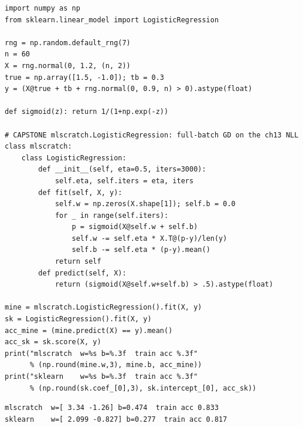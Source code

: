 \begin{lstlisting}[caption={\ttfamily code/ch14\_logistic.py ---
\textbf{capstone}: \texttt{mlscratch.LogisticRegression} trained by GD
on the ch.13 objective, checked against sklearn.}]
import numpy as np
from sklearn.linear_model import LogisticRegression

rng = np.random.default_rng(7)
n = 60
X = rng.normal(0, 1.2, (n, 2))
true = np.array([1.5, -1.0]); tb = 0.3
y = (X@true + tb + rng.normal(0, 0.9, n) > 0).astype(float)

def sigmoid(z): return 1/(1+np.exp(-z))

# CAPSTONE mlscratch.LogisticRegression: full-batch GD on the ch13 NLL
class mlscratch:
    class LogisticRegression:
        def __init__(self, eta=0.5, iters=3000):
            self.eta, self.iters = eta, iters
        def fit(self, X, y):
            self.w = np.zeros(X.shape[1]); self.b = 0.0
            for _ in range(self.iters):
                p = sigmoid(X@self.w + self.b)
                self.w -= self.eta * X.T@(p-y)/len(y)
                self.b -= self.eta * (p-y).mean()
            return self
        def predict(self, X):
            return (sigmoid(X@self.w+self.b) > .5).astype(float)

mine = mlscratch.LogisticRegression().fit(X, y)
sk = LogisticRegression().fit(X, y)
acc_mine = (mine.predict(X) == y).mean()
acc_sk = sk.score(X, y)
print("mlscratch  w=%s b=%.3f  train acc %.3f"
      % (np.round(mine.w,3), mine.b, acc_mine))
print("sklearn    w=%s b=%.3f  train acc %.3f"
      % (np.round(sk.coef_[0],3), sk.intercept_[0], acc_sk))
\end{lstlisting}

\begin{lstlisting}[caption={Output of the logistic capstone. Notice
accuracies match within a point; the weight gap is regularization, not a
bug.}]
mlscratch  w=[ 3.34 -1.26] b=0.474  train acc 0.833
sklearn    w=[ 2.099 -0.827] b=0.277  train acc 0.817
\end{lstlisting}

